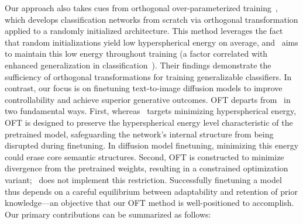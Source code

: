 Our approach also takes cues from orthogonal over-parameterized training~\cite{liu2021orthogonal}, which develops classification networks from scratch via orthogonal transformation applied to a randomly initialized architecture. This method leverages the fact that random initializations yield low hyperspherical energy on average, and~\cite{liu2021orthogonal} aims to maintain this low energy throughout training (a factor correlated with enhanced generalization in classification~\cite{liu2018learning,lin2020regularizing}). Their findings demonstrate the sufficiency of orthogonal transformations for training generalizable classifiers. In contrast, our focus is on finetuning text-to-image diffusion models to improve controllability and achieve superior generative outcomes. OFT departs from~\cite{liu2021orthogonal} in two fundamental ways. First, whereas~\cite{liu2021orthogonal} targets minimizing hyperspherical energy, OFT is designed to preserve the hyperspherical energy level characteristic of the pretrained model, safeguarding the network’s internal structure from being disrupted during finetuning. In diffusion model finetuning, minimizing this energy could erase core semantic structures. Second, OFT is constructed to minimize divergence from the pretrained weights, resulting in a constrained optimization variant;~\cite{liu2021orthogonal} does not implement this restriction. Successfully finetuning a model thus depends on a careful equilibrium between adaptability and retention of prior knowledge—an objective that our OFT method is well-positioned to accomplish. Our primary contributions can be summarized as follows:


